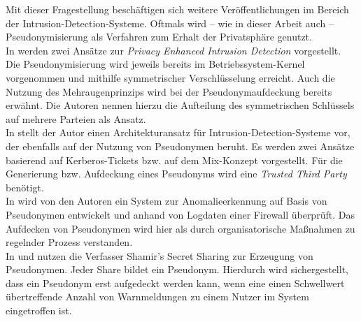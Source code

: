 
Mit dieser Fragestellung beschäftigen sich weitere Veröffentlichungen im Bereich der Intrusion-Detection-Systeme. Oftmals wird -- wie in dieser Arbeit auch -- Pseudonymisierung als Verfahren zum Erhalt der Privatsphäre genutzt.\\
In \cite{sobirey1997pseudonymous} werden zwei Ansätze zur \textit{Privacy Enhanced Intrusion Detection} vorgestellt. Die Pseudonymisierung wird jeweils bereits im Betriebssystem-Kernel vorgenommen und mithilfe symmetrischer Verschlüsselung erreicht. Auch die Nutzung des Mehraugenprinzips wird bei der Pseudonymaufdeckung bereits erwähnt. Die Autoren nennen hierzu die Aufteilung des symmetrischen Schlüssels auf mehrere Parteien als Ansatz.\\
In \cite{buschkes1999privacy} stellt der Autor einen Architekturansatz für Intrusion-Detection-Systeme vor, der ebenfalls auf der Nutzung von Pseudonymen beruht. Es werden zwei Ansätze basierend auf Kerberos-Tickets bzw. auf dem Mix-Konzept vorgestellt. Für die Generierung bzw. Aufdeckung eines Pseudonyms wird eine \textit{Trusted Third Party} benötigt.\\
In \cite{lundin2000anomaly} wird von den Autoren ein System zur Anomalieerkennung auf Basis von Pseudonymen entwickelt und anhand von Logdaten einer Firewall überprüft. Das Aufdecken von Pseudonymen wird hier als durch organisatorische Maßnahmen zu regelnder Prozess verstanden.\\
In \cite{biskup2000threshold} und \cite{biskup2001pseudonymization} nutzen die Verfasser Shamir's Secret Sharing zur Erzeugung von Pseudonymen. Jeder Share bildet ein Pseudonym. Hierdurch wird sichergestellt, dass ein Pseudonym erst aufgedeckt werden kann, wenn eine einen Schwellwert übertreffende Anzahl von Warnmeldungen zu einem Nutzer im System eingetroffen ist.




